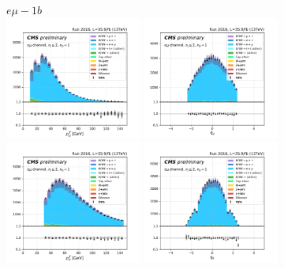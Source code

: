 \begin{figure}[ht]
    \centering
    $e \mu - 1b$ \\
    \includegraphics[width=0.4\textwidth]{chapters/Analysis/sectionPlots/figures/kinematics_pickles/emu2/1b/emu2_1b_lepton1_pt.pdf}
    \includegraphics[width=0.4\textwidth]{chapters/Analysis/sectionPlots/figures/kinematics_pickles/emu2/1b/emu2_1b_lepton1_eta.pdf}
    \includegraphics[width=0.4\textwidth]{chapters/Analysis/sectionPlots/figures/kinematics_pickles/emu2/1b/emu2_1b_lepton2_pt.pdf}
    \includegraphics[width=0.4\textwidth]{chapters/Analysis/sectionPlots/figures/kinematics_pickles/emu2/1b/emu2_1b_lepton2_eta.pdf}

\end{figure}
